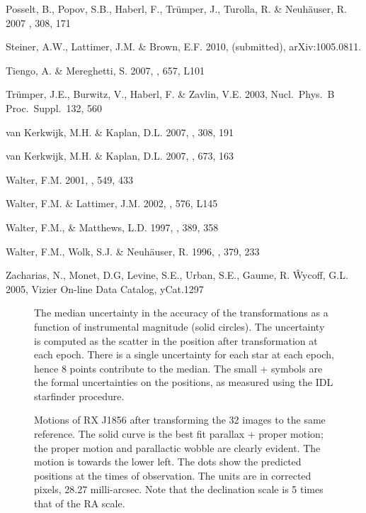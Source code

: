 \documentclass[12pt,preprint]{aastex}
\begin{document}
\begin{thebibliography}{}
 Posselt, B., Popov, S.B., Haberl, F.,
   Tr\"umper, J., Turolla, R. \& Neuh\"auser, R. 2007 \apss, 308, 171

 Steiner, A.W., Lattimer, J.M. \& Brown, E.F. 2010, \apj (submitted), arXiv:1005.0811.

 Tiengo, A. \& Mereghetti, S. 2007, \apj, 657, L101

 Tr\"umper, J.E., Burwitz, V., Haberl, F.
\&  Zavlin, V.E. 2003, Nucl.\ Phys.\ B Proc.\ Suppl.\ 132, 560

 van Kerkwijk, M.H. \&
    Kaplan, D.L. 2007, \apss, 308, 191

 van Kerkwijk, M.H. \&
    Kaplan, D.L. 2007, \apj, 673, 163

 Walter, F.M. 2001, \apj, 549, 433

 Walter, F.M. \& Lattimer, J.M. 2002,
\apj, 576, L145

 Walter, F.M., \& Matthews, L.D.
    1997, \nat, 389, 358

 Walter, F.M., Wolk, S.J. \& Neuh\"auser,
    R. 1996, \nat, 379, 233

 Zacharias, N., Monet, D.G,
        Levine, S.E., Urban, S.E., Gaume, R. \^ Wycoff, G.L. 2005,
        Vizier On-line Data Catalog, yCat.1297

\end{thebibliography}

\begin{figure}
\caption{The median uncertainty in the accuracy of the transformations as a
function of instrumental magnitude (solid circles).
The uncertainty is computed as the scatter
in the position after transformation at each epoch. There is a single
uncertainty for each star at each epoch, hence 8 points contribute to the
median. 
The small + symbols are the formal uncertainties on the positions, as
measured using the IDL starfinder procedure.
\label{fig-err_imag}}

\end{figure}
\begin{figure}
\caption{Motions of RX J1856 after transforming the 32 images to
the same reference. The solid curve is the best fit parallax + proper motion;
the proper motion and parallactic wobble are clearly evident. The motion is
towards the lower left.
The dots show the predicted positions at the times of observation.
The units are in corrected pixels, 28.27 milli-arcsec.
Note that the declination scale is 5 times that of the RA scale.
\label{fig-pm}}
\end{figure}
\end{document}
